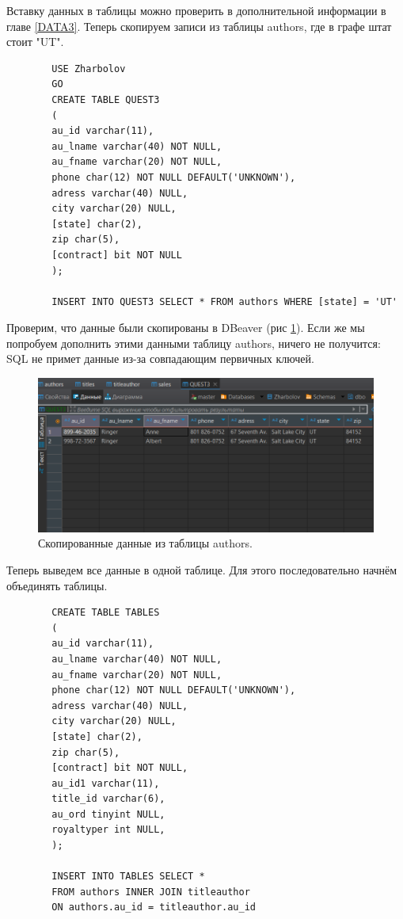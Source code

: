 Вставку данных в таблицы можно проверить в дополнительной информации в главе \ref{DATA3}. Теперь скопируем записи из таблицы authors, где в графе штат стоит "UT". 
\begin{verbatim}
        USE Zharbolov
        GO
        CREATE TABLE QUEST3
        (
        au_id varchar(11),
        au_lname varchar(40) NOT NULL,
        au_fname varchar(20) NOT NULL,
        phone char(12) NOT NULL DEFAULT('UNKNOWN'),
        adress varchar(40) NULL,
        city varchar(20) NULL,
        [state] char(2),
        zip char(5),
        [contract] bit NOT NULL	
        );
        
        INSERT INTO QUEST3 SELECT * FROM authors WHERE [state] = 'UT'
\end{verbatim}

Проверим, что данные были скопированы в DBeaver (рис \ref{fig:DataCopy3}). Если же мы попробуем дополнить этими данными таблицу authors, ничего не получится: SQL не примет данные из-за совпадающим первичных ключей. 
\begin{figure}
    \centering
    \includegraphics[width=0.9\linewidth]{Pic/lab3/DataCopy.PNG}
    \caption{Скопированные данные из таблицы authors.}
    \label{fig:DataCopy3}
\end{figure}
Теперь выведем все данные в одной таблице. Для этого последовательно начнём объединять таблицы.

\begin{verbatim}
        CREATE TABLE TABLES
        (
        au_id varchar(11),
        au_lname varchar(40) NOT NULL,
        au_fname varchar(20) NOT NULL,
        phone char(12) NOT NULL DEFAULT('UNKNOWN'),
        adress varchar(40) NULL,
        city varchar(20) NULL,
        [state] char(2),
        zip char(5),
        [contract] bit NOT NULL,	
        au_id1 varchar(11),
        title_id varchar(6),
        au_ord tinyint NULL,
        royaltyper int NULL,
        );
        
        INSERT INTO TABLES SELECT * 
        FROM authors INNER JOIN titleauthor 
        ON authors.au_id = titleauthor.au_id
\end{verbatim}

